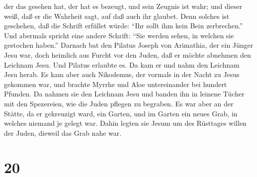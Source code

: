 der das gesehen hat, der hat es bezeugt, und sein Zeugnis ist wahr; und
dieser weiß, daß er die Wahrheit sagt, auf daß auch ihr glaubet.
 Denn solches ist geschehen, daß die Schrift erfüllet
würde: ``Ihr sollt ihm kein Bein zerbrechen.''  Und
abermals spricht eine andere Schrift: ``Sie werden sehen, in welchen sie
gestochen haben.''  Darnach bat den Pilatus Joseph von
Arimathia, der ein Jünger Jesu war, doch heimlich aus Furcht vor den
Juden, daß er möchte abnehmen den Leichnam Jesu. Und Pilatus erlaubte
es. Da kam er und nahm den Leichnam Jesu herab.  Es kam
aber auch Nikodemus, der vormals in der Nacht zu Jesus gekommen war, und
brachte Myrrhe und Aloe untereinander bei hundert Pfunden. 
Da nahmen sie den Leichnam Jesu und banden ihn in leinene Tücher mit den
Spezereien, wie die Juden pflegen zu begraben.  Es war aber
an der Stätte, da er gekreuzigt ward, ein Garten, und im Garten ein
neues Grab, in welches niemand je gelegt war.  Dahin legten
sie Jesum um des Rüsttages willen der Juden, dieweil das Grab nahe war.

\hypertarget{section-19}{%
\section{20}\label{section-19}}

